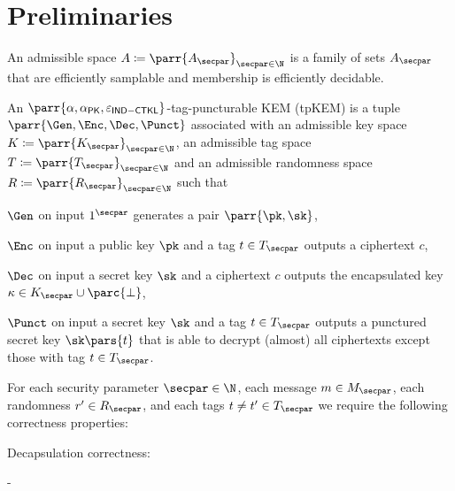 \section{Preliminaries}
\label{sec:prelims}

\begin{definition}
    An admissible space \(A \coloneqq \parr{A_\secpar}_{\secpar \in \N}\) is a family of sets \(A_\secpar\) that are efficiently samplable and membership is efficiently decidable.
\end{definition}

\begin{definition}
    An \(\parr{\alpha,\alpha_{\mathsf{PK}},\varepsilon_{\mathsf{IND-CTKL}}}\)-tag-puncturable KEM (tpKEM) is a tuple \(\parr{\Gen,\Enc,\Dec,\Punct}\) associated with
    an admissible key space \(K \coloneqq \parr{K_\secpar}_{\secpar \in \N}\),
    an admissible tag space \(T \coloneqq \parr{T_\secpar}_{\secpar \in \N}\) and
    an admissible randomness space \(R \coloneqq \parr{R_\secpar}_{\secpar \in \N}\) such that
    \begin{sitemize}
        \item \(\Gen\) on input \(1^\secpar\) generates a pair \(\parr{\pk,\sk}\),
        \item \(\Enc\) on input a public key \(\pk\) and a tag \(t \in T_\secpar\) outputs a ciphertext \(c\),
        \item \(\Dec\) on input a secret key \(\sk\) and a ciphertext \(c\) outputs the encapsulated key \(\kappa \in K_\secpar \cup \parc{\bot}\),
        \item \(\Punct\) on input a secret key \(\sk\) and a tag \(t \in T_\secpar\) outputs a punctured secret key \(\sk\pars{t}\) that is able to decrypt (almost) all ciphertexts except those with tag \(t \in T_\secpar\).
    \end{sitemize}
    For each security parameter \(\secpar \in \N\),
    each message \(m \in M_\secpar\),
    each randomness \(r' \in R_\secpar\),
    and each tags \(t \neq t' \in T_\secpar\) we require the following correctness properties:
    \begin{sitemize}
        \item Decapsulation correctness:
        \begin{bralign}
             - \alpha\parr{\secpar}
        \end{bralign}


\end{sitemize}
\end{definition}
